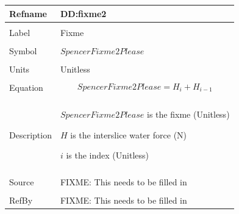 \documentclass[12pt]{article}
\begin{document}
\noindent \begin{minipage}{\textwidth}
\begin{tabular}{p{} p{}}
\toprule \textbf{Refname} & \textbf{DD:fixme2}
\label{DD:fixme2}
\\ \midrule \\
Label & Fixme
\\ \midrule \\
Symbol & $SpencerFixme2Please$
\\ \midrule \\
Units & Unitless
\\ \midrule \\
Equation & \begin{dmath}
           SpencerFixme2Please=H_{i}+H_{i-1}
           \end{dmath}
\\ \midrule \\
Description & \begin{symbDescription}
              \item{$SpencerFixme2Please$ is the fixme (Unitless)}
              \item{$H$ is the interslice water force (N)}
              \item{$i$ is the index (Unitless)}
              \end{symbDescription}
\\ \midrule \\
Source & FIXME: This needs to be filled in
\\ \midrule \\
RefBy & FIXME: This needs to be filled in
\\ \bottomrule \end{tabular}
\end{minipage}\\
\end{document}
